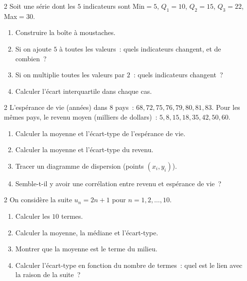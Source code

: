 \begin{probleme}{2}
Soit une s\'erie dont les $5$ indicateurs sont Min$=5$,
$Q_1=10$, $Q_2=15$, $Q_3=22$, Max$=30$.
\begin{enumerate}
  \item Construire la bo\^ite \`a moustaches.
  \item Si on ajoute $5$ \`a toutes les valeurs~:
        quels indicateurs changent, et de combien~?
  \item Si on multiplie toutes les valeurs par $2$~:
        quels indicateurs changent~?
  \item Calculer l'\'ecart interquartile dans chaque cas.
\end{enumerate}
\end{probleme}

\begin{probleme}{2}
L'esp\'erance de vie (ann\'ees) dans $8$ pays~: $68, 72, 75, 76, 79, 80, 81, 83$.
Pour les m\^emes pays, le revenu moyen (milliers de dollars)~:
$5, 8, 15, 18, 35, 42, 50, 60$.
\begin{enumerate}
  \item Calculer la moyenne et l'\'ecart-type de l'esp\'erance de vie.
  \item Calculer la moyenne et l'\'ecart-type du revenu.
  \item Tracer un diagramme de dispersion (points $(x_i, y_i)$).
  \item Semble-t-il y avoir une corr\'elation entre revenu et esp\'erance de vie~?
\end{enumerate}
\end{probleme}

\begin{probleme}{2}
On consid\`ere la suite $u_n = 2n+1$ pour $n = 1, 2, \ldots, 10$.
\begin{enumerate}
  \item Calculer les $10$ termes.
  \item Calculer la moyenne, la m\'ediane et l'\'ecart-type.
  \item Montrer que la moyenne est le terme du milieu.
  \item Calculer l'\'ecart-type en fonction du nombre de termes~:
        quel est le lien avec la raison de la suite~?
\end{enumerate}
\end{probleme}

